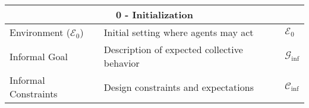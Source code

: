 \begin{table}[h!]
    \centering
    \renewcommand{\arraystretch}{1.3}
    \begin{footnotesize}
        \begin{tabular}{|p{2cm}|p{6cm}|p{3cm}|}
            \hline
            \multicolumn{3}{|c|}{\textbf{0 - Initialization}}                                                                                                                                                                                                                              \\ \hline
            Environment ($\mathcal{E}_0$) & Initial setting where agents may act                                           & $\mathcal{E}_0$                                                                                                                                               \\ \hline
            Informal Goal                 & Description of expected collective behavior                                    & $\mathcal{G}_{\text{inf}}$                                                                                                                                    \\ \hline
            Informal Constraints          & Design constraints and expectations                                            & $\mathcal{C}_{\text{inf}}$                                                                                                                                    \\ \hline


\end{tabular}
\end{footnotesize}
\end{table}
